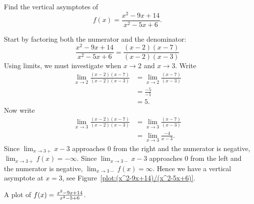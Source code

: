 \begin{example}
Find the vertical asymptotes of 
\[
f(x) = \frac{x^2-9x+14}{x^2-5x+6}.
\]
\end{example}
\begin{solution}
Start by factoring both the numerator and the denominator:
\[
\frac{x^2-9x+14}{x^2-5x+6} = \frac{(x-2)(x-7)}{(x-2)(x-3)}
\]
Using limits, we must investigate when $x\to 2$ and $x\to 3$. Write
\begin{align*}
\lim_{x\to 2} \frac{(x-2)(x-7)}{(x-2)(x-3)} &= \lim_{x\to 2} \frac{(x-7)}{(x-3)}\\
&= \frac{-5}{-1}\\
&=5.
\end{align*}
Now write
\begin{align*}
\lim_{x\to 3} \frac{(x-2)(x-7)}{(x-2)(x-3)} &= \lim_{x\to 3} \frac{(x-7)}{(x-3)}\\
&= \lim_{x\to 3}\frac{-4}{x-3}.
\end{align*}
Since $\lim_{x\to 3+} x-3$ approaches $0$ from the right and the
numerator is negative, $\lim_{x\to 3+} f(x) = -\infty$. Since
$\lim_{x\to 3-} x-3$ approaches $0$ from the left and the numerator is
negative, $\lim_{x\to 3-} f(x) = \infty$. Hence we have a vertical
asymptote at $x=3$, see Figure~\ref{plot:(x^2-9x+14)/(x^2-5x+6)}.
\end{solution}
\begin{marginfigure}[-4in]
\caption{A plot of $f(x)=\protect\frac{x^2-9x+14}{x^2-5+6}$.}
\label{plot:(x^2-9x+14)/(x^2-5x+6)}
\end{marginfigure}


